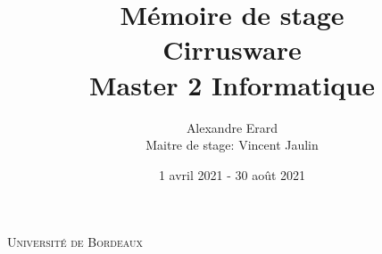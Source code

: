 \documentclass[french]{article}
\title{
    Mémoire de stage\\
    \large Cirrusware \\
    \large Master 2 Informatique
    }
\author{
    Alexandre Erard\\
    Maitre de stage: Vincent Jaulin
}
\date{1 avril 2021 - 30 août 2021}
\begin{document}
\maketitle
\begin{center}
    \textsc{\LARGE Université de Bordeaux}
\end{center}

\newpage





\tableofcontents





\end{document}
